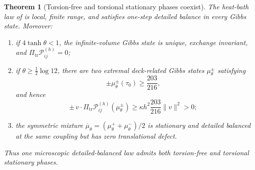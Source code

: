 \documentclass[11pt]{article}
\newtheorem{theorem}{Theorem}[section]
\theoremstyle{definition}
\theoremstyle{remark}
\newcommand{\norm}[1]{\lVert#1\rVert}
\begin{document}
\begin{theorem}[Torsion-free and torsional stationary phases coexist]
\label{thm:torsion-phase-coexistence}
The heat-bath law of  is local, finite range, and
satisfies one-step detailed balance in every Gibbs state.  Moreover:
\begin{enumerate}[label=\textup{(\roman*)},leftmargin=2.4em]
\item if $4\tanh\theta<1$, the infinite-volume Gibbs state is unique,
      exchange invariant, and
      $\Pi_{\mathrm{tr}}\mathcal P_{ij}^{(h)}=0$;
\item if $\theta\ge\tfrac12\log12$, there are two extremal deck-related Gibbs
      states $\mu_\theta^\pm$ satisfying
      \[
       \pm\mu_\theta^\pm(\tau_0)\ge\frac{203}{216},
      \]
      and hence
      \[
       \pm\,v\cdot
       \Pi_{\mathrm{tr}}\mathcal P_{ij}^{(h)}(\mu_\theta^\pm)
       \ge \kappa h^2\frac{203}{216}\norm{v}^2>0;
      \]
\item the symmetric mixture
      $\overline\mu_\theta=(\mu_\theta^++\mu_\theta^-)/2$ is stationary and
      detailed balanced at the same coupling but has zero translational defect.
\end{enumerate}
Thus one microscopic detailed-balanced law admits both torsion-free and
torsional stationary phases.
\end{theorem}
\end{document}

